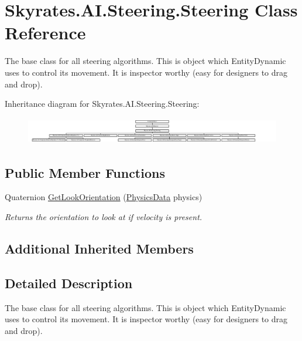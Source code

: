 \hypertarget{class_skyrates_1_1_a_i_1_1_steering_1_1_steering}{\section{Skyrates.\-A\-I.\-Steering.\-Steering Class Reference}
\label{class_skyrates_1_1_a_i_1_1_steering_1_1_steering}
}


The base class for all steering algorithms. This is object which Entity\-Dynamic uses to control its movement. It is inspector worthy (easy for designers to drag and drop).  


Inheritance diagram for Skyrates.\-A\-I.\-Steering.\-Steering\-:\begin{figure}[H]
\begin{center}
\leavevmode
\includegraphics[height=1.186944cm]{class_skyrates_1_1_a_i_1_1_steering_1_1_steering}
\end{center}
\end{figure}
\subsection*{Public Member Functions}
\begin{DoxyCompactItemize}
\item 
Quaternion \hyperlink{class_skyrates_1_1_a_i_1_1_steering_1_1_steering_a695effd393279318e71cbdf0d4c96f5a}{Get\-Look\-Orientation} (\hyperlink{class_skyrates_1_1_physics_1_1_physics_data}{Physics\-Data} physics)
\begin{DoxyCompactList}\small\item\em Returns the orientation to look at if velocity is present. \end{DoxyCompactList}\end{DoxyCompactItemize}
\subsection*{Additional Inherited Members}


\subsection{Detailed Description}
The base class for all steering algorithms. This is object which Entity\-Dynamic uses to control its movement. It is inspector worthy (easy for designers to drag and drop). 



